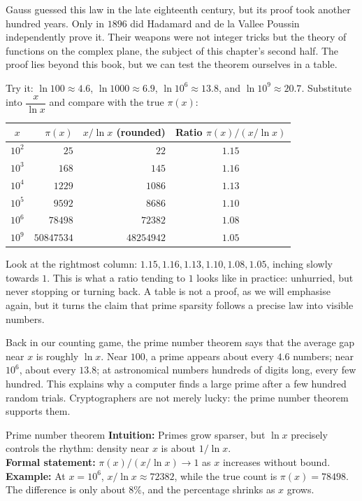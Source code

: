 \begin{zhu}
Gauss guessed this law in the late eighteenth century, but its proof took another hundred years. Only in $1896$ did Hadamard and de la Vallee Poussin independently prove it. Their weapons were not integer tricks but the theory of functions on the complex plane, the subject of this chapter's second half. The proof lies beyond this book, but we can test the theorem ourselves in a table.
\end{zhu}

Try it: $\ln 100\approx4.6$, $\ln 1000\approx6.9$, $\ln 10^{6}\approx13.8$, and $\ln 10^{9}\approx20.7$. Substitute into $\dfrac{x}{\ln x}$ and compare with the true $\pi(x)$:

\begin{center}
\begin{tabular}{crrc}
\toprule
$x$ & $\pi(x)$ & $x/\ln x$ (rounded) & Ratio $\pi(x)/(x/\ln x)$ \\
\midrule
$10^{2}$ & $25$ & $22$ & $1.15$ \\
$10^{3}$ & $168$ & $145$ & $1.16$ \\
$10^{4}$ & $1229$ & $1086$ & $1.13$ \\
$10^{5}$ & $9592$ & $8686$ & $1.10$ \\
$10^{6}$ & $78498$ & $72382$ & $1.08$ \\
$10^{9}$ & $50847534$ & $48254942$ & $1.05$ \\
\bottomrule
\end{tabular}
\end{center}

Look at the rightmost column: $1.15,1.16,1.13,1.10,1.08,1.05$, inching slowly towards $1$. This is what a ratio tending to $1$ looks like in practice: unhurried, but never stopping or turning back. A table is not a proof, as we will emphasise again, but it turns the claim that prime sparsity follows a precise law into visible numbers.

Back in our counting game, the prime number theorem says that the average gap near $x$ is roughly $\ln x$. Near $100$, a prime appears about every $4.6$ numbers; near $10^{6}$, about every $13.8$; at astronomical numbers hundreds of digits long, every few hundred. This explains why a computer finds a large prime after a few hundred random trials. Cryptographers are not merely lucky: the prime number theorem supports them.

\begin{shuyu}{Prime number theorem}
\textbf{Intuition:} Primes grow sparser, but $\ln x$ precisely controls the rhythm: density near $x$ is about $1/\ln x$.\\
\textbf{Formal statement:} $\pi(x)/(x/\ln x)\to 1$ as $x$ increases without bound.\\
\textbf{Example:} At $x=10^{6}$, $x/\ln x\approx72382$, while the true count is $\pi(x)=78498$. The difference is only about $8\%$, and the percentage shrinks as $x$ grows.
\end{shuyu}

